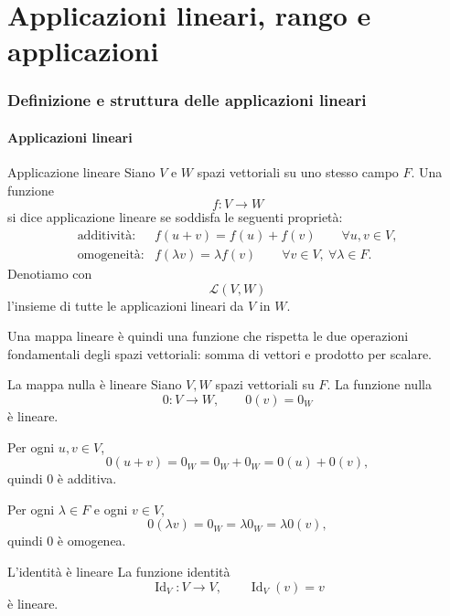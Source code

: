 \documentclass[a4paper]{article}
\begin{document}
\part{Applicazioni lineari, rango e applicazioni}

\section{Definizione e struttura delle applicazioni lineari}

\subsection{Applicazioni lineari}

\begin{snippetdefinition}{Applicazione lineare}
    Siano \(V\) e \(W\) spazi vettoriali su uno stesso campo \(F\). Una funzione
    \[
        f:V\to W
    \]
    si dice applicazione lineare se soddisfa le seguenti proprietà:
    \[
        \begin{array}{ll}
            \text{additività:} & f(u+v)=f(u)+f(v) \qquad \forall u,v\in V,\\[2mm]
            \text{omogeneità:} & f(\lambda v)=\lambda f(v) \qquad \forall v\in V,\ \forall \lambda\in F.
        \end{array}
    \]
    Denotiamo con
    \[
        \mathcal{L}(V,W)
    \]
    l'insieme di tutte le applicazioni lineari da \(V\) in \(W\).
\end{snippetdefinition}

Una mappa lineare è quindi una funzione che rispetta le due operazioni fondamentali degli spazi vettoriali: somma di vettori e prodotto per scalare.

\begin{snippetproposition}{La mappa nulla è lineare}
    Siano \(V,W\) spazi vettoriali su \(F\). La funzione nulla
    \[
        0:V\to W,
        \qquad
        0(v)=0_W
    \]
    è lineare.
\end{snippetproposition}

\begin{snippetproof}{}
    Per ogni \(u,v\in V\),
    \[
        0(u+v)=0_W=0_W+0_W=0(u)+0(v),
    \]
    quindi \(0\) è additiva.

    Per ogni \(\lambda\in F\) e ogni \(v\in V\),
    \[
        0(\lambda v)=0_W=\lambda 0_W=\lambda 0(v),
    \]
    quindi \(0\) è omogenea.
\end{snippetproof}

\begin{snippetproposition}{L'identità è lineare}
    La funzione identità
    \[
        \operatorname{Id}_V:V\to V,
        \qquad
        \operatorname{Id}_V(v)=v
    \]
    è lineare.
\end{snippetproposition}
\end{document}
